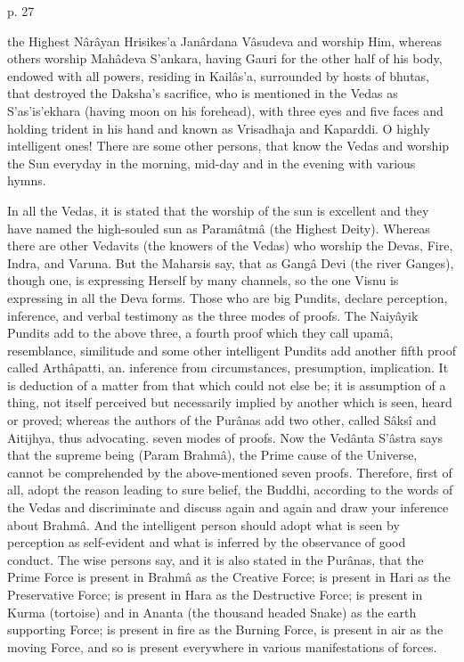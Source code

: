  

p. 27

 

the Highest Nârâyan Hrisikes'a Janârdana Vâsudeva and worship Him, whereas others worship Mahâdeva S’ankara, having Gauri for the other half of his body, endowed with all powers, residing in Kailâs'a, surrounded by hosts of bhutas, that destroyed the Daksha's sacrifice, who is mentioned in the Vedas as S’as'is'ekhara (having moon on his forehead), with three eyes and five faces and holding trident in his hand and known as Vrisadhaja and Kaparddi. O highly intelligent ones! There are some other persons, that know the Vedas and worship the Sun everyday in the morning, mid-day and in the evening with various hymns.

 

In all the Vedas, it is stated that the worship of the sun is excellent and they have named the high-souled sun as Paramâtmâ (the Highest Deity). Whereas there are other Vedavits (the knowers of the Vedas) who worship the Devas, Fire, Indra, and Varuna. But the Maharsis say, that as Gangâ Devi (the river Ganges), though one, is expressing Herself by many channels, so the one Visnu is expressing in all the Deva forms. Those who are big Pundits, declare perception, inference, and verbal testimony as the three modes of proofs. The Naiyâyik Pundits add to the above three, a fourth proof which they call upamâ, resemblance, similitude and some other intelligent Pundits add another fifth proof called Arthâpatti, an. inference from circumstances, presumption, implication. It is deduction of a matter from that which could not else be; it is assumption of a thing, not itself perceived but necessarily implied by another which is seen, heard or proved; whereas the authors of the Purânas add two other, called Sâksî and Aitijhya, thus advocating. seven modes of proofs. Now the Vedânta S’âstra says that the supreme being (Param Brahmâ), the Prime cause of the Universe, cannot be comprehended by the above-mentioned seven proofs. Therefore, first of all, adopt the reason leading to sure belief, the Buddhi, according to the words of the Vedas and discriminate and discuss again and again and draw your inference about Brahmâ. And the intelligent person should adopt what is seen by perception as self-evident and what is inferred by the observance of good conduct. The wise persons say, and it is also stated in the Purânas, that the Prime Force is present in Brahmâ as the Creative Force; is present in Hari as the Preservative Force; is present in Hara as the Destructive Force; is present in Kurma (tortoise) and in Ananta (the thousand headed Snake) as the earth supporting Force; is present in fire as the Burning Force, is present in air as the moving Force, and so is present everywhere in various manifestations of forces.

